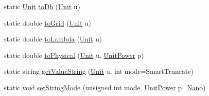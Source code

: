 \begin{DoxyCompactItemize}
\item 
static \mbox{\hyperlink{group__DbUGroup_ga4fbfa3e8c89347af76c9628ea06c4146}{Unit}} \mbox{\hyperlink{group__DbUGroup_gaec07c6e7ae2a2a6f54e2a16b32c8bf26}{to\+Db}} (\mbox{\hyperlink{group__DbUGroup_ga4fbfa3e8c89347af76c9628ea06c4146}{Unit}} u)
\item 
static double \mbox{\hyperlink{group__DbUGroup_ga318d673386c9424e07c12efd598c730d}{to\+Grid}} (\mbox{\hyperlink{group__DbUGroup_ga4fbfa3e8c89347af76c9628ea06c4146}{Unit}} u)
\item 
static double \mbox{\hyperlink{group__DbUGroup_ga4923a9a443871282ad7d331be2a2a5d4}{to\+Lambda}} (\mbox{\hyperlink{group__DbUGroup_ga4fbfa3e8c89347af76c9628ea06c4146}{Unit}} u)
\item 
static double \mbox{\hyperlink{group__DbUGroup_gab901e9d5c12e878728178f113def6c45}{to\+Physical}} (\mbox{\hyperlink{group__DbUGroup_ga4fbfa3e8c89347af76c9628ea06c4146}{Unit}} u, \mbox{\hyperlink{group__DbUGroup_ga50b5785bf4d75026c4c112caec3040a7}{Unit\+Power}} p)
\item 
static string \mbox{\hyperlink{group__DbUGroup_gadc9c1a06b4296dbddcf711077113f4bd}{get\+Value\+String}} (\mbox{\hyperlink{group__DbUGroup_ga4fbfa3e8c89347af76c9628ea06c4146}{Unit}} u, int mode=Smart\+Truncate)
\item 
static void \mbox{\hyperlink{group__DbUGroup_ga89ab8f8326c54113336086663ecf1d25}{set\+String\+Mode}} (unsigned int mode, \mbox{\hyperlink{group__DbUGroup_ga50b5785bf4d75026c4c112caec3040a7}{Unit\+Power}} p=\mbox{\hyperlink{group__DbUGroup_gga50b5785bf4d75026c4c112caec3040a7a03e5923be5810db830626f2ca26319d6}{Nano}})
\end{DoxyCompactItemize}

